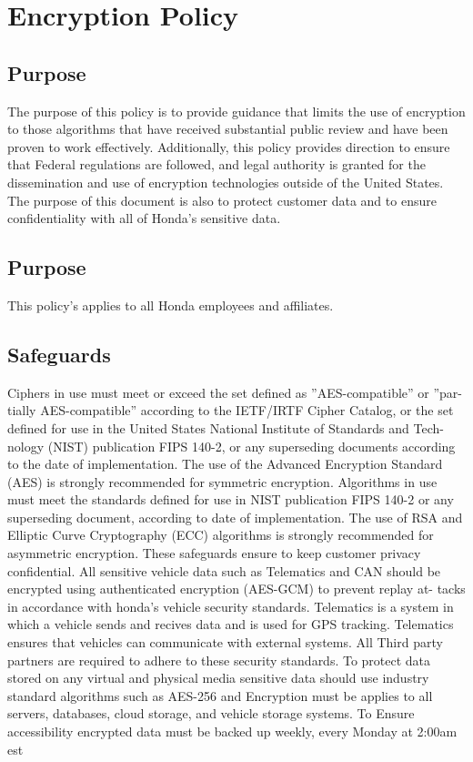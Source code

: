 \documentclass[12pt]{report}
\begin{document}
\chapter{Encryption Policy}

\section{Purpose}

The purpose of this policy is to provide guidance that limits the use of encryption
to those algorithms that have received substantial public review and have been
proven to work effectively. Additionally, this policy provides direction to ensure
that Federal regulations are followed, and legal authority is granted for the
dissemination and use of encryption technologies outside of the United States.
The purpose of this document is also to protect customer data and to ensure
confidentiality with all of Honda’s sensitive data.

\section{Purpose}
This policy’s applies to all Honda employees and affiliates.

\section{Safeguards}
Ciphers in use must meet or exceed the set defined as ”AES-compatible” or ”par-
tially AES-compatible” according to the IETF/IRTF Cipher Catalog, or the set
defined for use in the United States National Institute of Standards and Tech-
nology (NIST) publication FIPS 140-2, or any superseding documents according
to the date of implementation. The use of the Advanced Encryption Standard
(AES) is strongly recommended for symmetric encryption. Algorithms in use
must meet the standards defined for use in NIST publication FIPS 140-2 or any
superseding document, according to date of implementation. The use of RSA
and Elliptic Curve Cryptography (ECC) algorithms is strongly recommended
for asymmetric encryption. These safeguards ensure to keep customer privacy
confidential. All sensitive vehicle data such as Telematics and CAN should be
encrypted using authenticated encryption (AES-GCM) to prevent replay at-
tacks in accordance with honda’s vehicle security standards. Telematics is a
system in which a vehicle sends and recives data and is used for GPS tracking.
Telematics ensures that vehicles can communicate with external systems. All
Third party partners are required to adhere to these security standards. To
protect data stored on any virtual and physical media sensitive data should use
industry standard algorithms such as AES-256 and Encryption must be applies
to all servers, databases, cloud storage, and vehicle storage systems. To Ensure
accessibility encrypted data must be backed up weekly, every Monday at 2:00am
est
\end{document}
